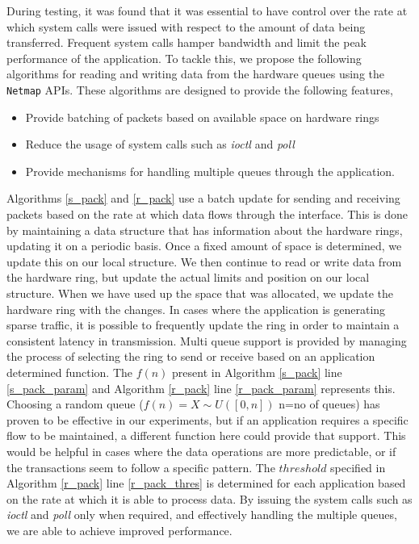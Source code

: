 \documentclass[10pt, conference, compsocconf, reqno]{IEEEtran}
\newcommand{\comment}[1]{}
\begin{document}
During testing, it was found that it was essential to have control over the rate at which system calls were issued with respect to the amount of data being transferred. Frequent system calls hamper bandwidth and limit the peak performance of the application. To tackle this, we propose the following algorithms for reading and writing data from the hardware queues using the \texttt{Netmap} APIs. These algorithms are designed to provide the following features,

\begin{itemize}

\item Provide batching of packets based on available space on hardware rings
\item Reduce the usage of system calls such as \textit{ioctl} and \textit {poll}
\item Provide mechanisms for handling multiple queues through the application.

\end{itemize}

\comment{By minimizing the synchronizations with the hardware rings, we essentially limit the system calls issued and consequently improve the overall system performance.}










Algorithms \ref{s_pack} and \ref{r_pack} use a batch update for sending and receiving packets based on the rate at which data flows through the interface. This is done by maintaining a data structure that has information about the hardware rings, updating it on a periodic basis. Once a fixed amount of space is determined, we update this on our local structure. We then continue to read or write data from the hardware ring, but update the actual limits and position on our local structure. When we have used up the space that was allocated, we update the hardware ring with the changes. In cases where the application is generating sparse traffic, it is possible to frequently update the ring in order to maintain a consistent latency in transmission. Multi queue support is provided by managing the process of selecting the ring to send or receive based on an application determined function. The $f(n)$ present in Algorithm \ref{s_pack} line \ref{s_pack_param} and Algorithm \ref{r_pack} line \ref{r_pack_param} represents this. Choosing a random queue ($f(n)=X \sim U([0,n])$ n=no of queues) has proven to be effective in our experiments, but if an application requires a specific flow to be maintained, a different function here could provide that support. This would be helpful in cases where the data operations are more predictable, or if the transactions seem to follow a specific pattern. The $threshold$ specified in Algorithm \ref{r_pack} line \ref{r_pack_thres} is determined for each application based on the rate at which it is able to process data. By issuing the system calls such as \textit{ioctl} and \textit{poll} only when required, and effectively handling the multiple queues, we are able to achieve improved performance.
\end{document}
